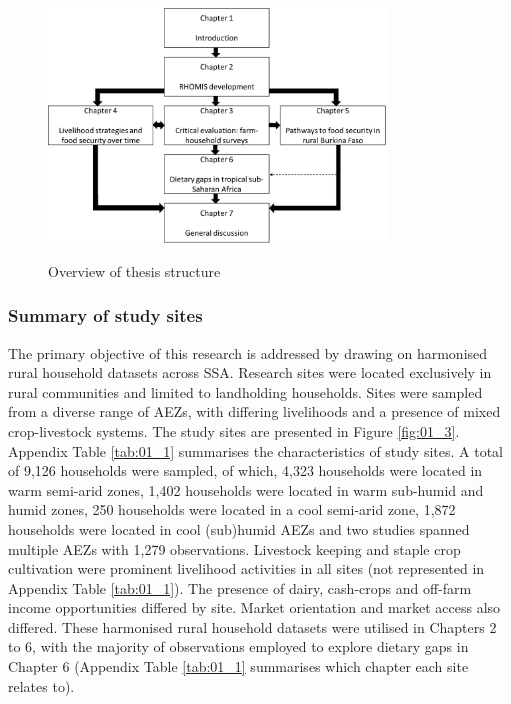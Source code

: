 \begin{figure}
    \includegraphics[width=0.8\textwidth]{figs_01/image1.png}

  \captionsetup{singlelinecheck = false, justification=raggedright} %
  \label{fig:01_2}
  \caption{Overview of thesis structure}
\end{figure}

\subsubsection{Summary of study sites}

The primary objective of this research is addressed by drawing on harmonised rural household datasets across SSA. Research sites were located exclusively in rural communities and limited to landholding households. Sites were sampled from a diverse range of AEZs, with differing livelihoods and a presence of mixed crop-livestock systems. The study sites are presented in Figure \ref{fig:01_3}. Appendix Table \ref{tab:01_1} summarises the characteristics of study sites. A total of 9,126 households were sampled, of which, 4,323 households were located in warm semi-arid zones, 1,402 households were located in warm sub-humid and humid zones, 250 households were located in a cool semi-arid zone, 1,872 households were located in cool (sub)humid AEZs and two studies spanned multiple AEZs with 1,279 observations. Livestock keeping and staple crop cultivation were prominent livelihood activities in all sites (not represented in Appendix Table \ref{tab:01_1}). The presence of dairy, cash-crops and off-farm income opportunities differed by site. Market orientation and market access also differed. These harmonised rural household datasets were utilised in Chapters 2 to 6, with the majority of observations employed to explore dietary gaps in Chapter 6 (Appendix Table \ref{tab:01_1} summarises which chapter each site relates to).



